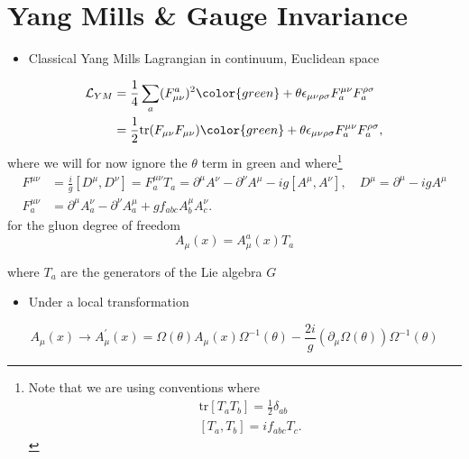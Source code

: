 
\section{Yang Mills \& Gauge Invariance}

\begin{itemize}
\item Classical Yang Mills Lagrangian in continuum, Euclidean space
\end{itemize}
\begin{align}
    \mathcal{L}_{YM} &= \frac{1}{4}\sum_a(F_{\mu \nu}^a)^2 \color{green} + \theta \epsilon_{\mu \nu \rho \sigma} F^{\mu \nu}_a F^{\rho \sigma}_a \nonumber \\
    &= \frac{1}{2} \text{tr}(F_{\mu \nu} F_{\mu \nu}) \color{green} + \theta \epsilon_{\mu \nu \rho \sigma} F^{\mu \nu}_a F^{\rho \sigma}_a, 
\end{align}
where we will for now ignore the $\theta$ term in green and where\footnote{Note that we are using  conventions where
\begin{equation}
\begin{aligned}
& \text{tr}\left[T_{a} T_{b}\right]=\frac{1}{2} \delta_{a b} \\
& {\left[T_{a}, T_{b}\right]=i f_{a b c} T_{c}}.
\end{aligned}
\end{equation}}
\begin{align}
F^{\mu \nu} &= \frac{i}{g}[D^\mu, D^\nu] = F^{\mu \nu}_a T_a = \partial^\mu A^\nu - \partial^\nu A^\mu - i g [A^\mu, A^\nu],\quad  D^\mu = \partial^\mu - i g A^\mu \nonumber \\
F^{\mu \nu}_a &= \partial^\mu A^\nu_a - \partial^\nu A^\mu_a + g f_{abc}A^\mu_b A^\nu_c.
\end{align}
for the gluon degree of freedom
\begin{equation}
A_{\mu}(x)=A_{\mu}^{a}(x) T_{a}
\end{equation}

where \(T_{a}\) are the generators of the Lie algebra \(G\)

\begin{itemize}
  \item Under a local transformation
\end{itemize}

\begin{equation}
A_{\mu}(x) \rightarrow A_{\mu}^{\prime}(x)=\Omega(\theta) A_{\mu}(x) \Omega^{-1}(\theta)-\frac{2 i}{g}\left(\partial_{\mu} \Omega(\theta)\right) \Omega^{-1}(\theta)
\end{equation}

